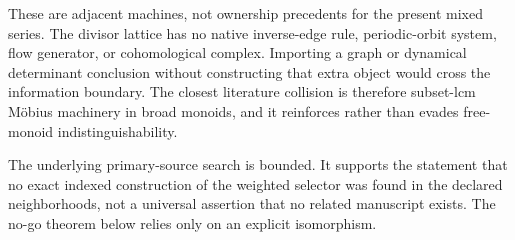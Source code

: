 These are adjacent machines, not ownership precedents for the present mixed
series.  The divisor lattice has no native inverse-edge rule, periodic-orbit
system, flow generator, or cohomological complex.  Importing a graph or
dynamical determinant conclusion without constructing that extra object
would cross the information boundary.  The closest literature collision is
therefore subset-lcm M{\"o}bius machinery in broad monoids, and it reinforces
rather than evades free-monoid indistinguishability.

The underlying primary-source search is bounded.  It supports the statement
that no exact indexed construction of the weighted selector was found in
the declared neighborhoods, not a universal assertion that no related
manuscript exists.  The no-go theorem below relies only on an explicit
isomorphism.
